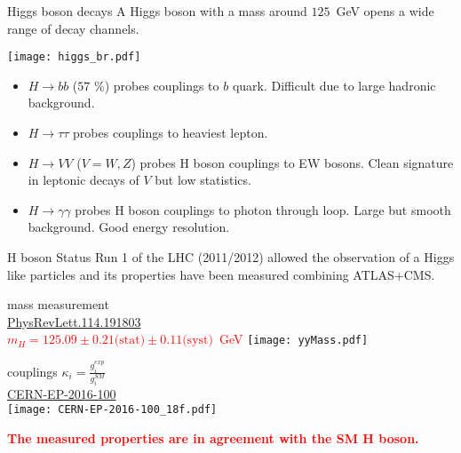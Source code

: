 \begin{frame}{Higgs boson decays}
  A Higgs boson with a mass around $125$~GeV opens a wide range of decay channels.
  
  \begin{minipage}{0.49\linewidth}
    \centering
    \texttt{[image: higgs\_br.pdf]}
  \end{minipage}
  \hfill
  \begin{minipage}{0.49\linewidth}
    \begin{itemize}
    \item $H\rightarrow bb$ ($57$ \%) probes couplings to $b$ quark.
      Difficult due to large hadronic background.
    \item $H\rightarrow \tau\tau$ probes couplings to heaviest lepton.
    \item $H\rightarrow VV$ ($V=W,Z$) probes H boson couplings to EW bosons.
      Clean signature in leptonic decays of $V$ but low statistics.
    \item $H\rightarrow\gamma\gamma$ probes H boson couplings to photon through loop.
      Large but smooth background. Good energy resolution.
    \end{itemize}
  \end{minipage}
  
\end{frame}
\begin{frame}{H boson Status}
  Run 1 of the LHC (2011/2012) allowed the observation of a Higgs like particles and its properties have been measured combining ATLAS+CMS.
  \vfill
  \begin{minipage}[t]{0.59\linewidth}
    \centering
    mass measurement \\  \href{http://journals.aps.org/prl/pdf/10.1103/PhysRevLett.114.191803}{PhysRevLett.114.191803}\\
    \textcolor{red}{$m_H = 125.09 \pm 0.21 \text{(stat)} \pm 0.11 \text{(syst)} $~GeV}  
    \texttt{[image: yyMass.pdf]}
  \end{minipage}
  \hfill
  \begin{minipage}[t]{0.4\linewidth}
    \centering
    couplings $\kappa_i =\frac{g_i^{exp}}{g_i^{SM}}$ \\
    \href{https://cds.cern.ch/record/2158863}{CERN-EP-2016-100} \\
    \vfill
    \texttt{[image: CERN-EP-2016-100\_18f.pdf]} 
  \end{minipage}
\textcolor{red}{\bf The measured properties are in agreement with the SM H boson.}
\end{frame}
